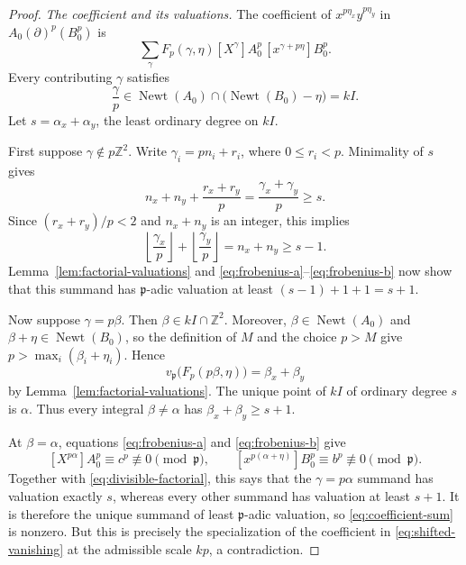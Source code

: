 \documentclass[11pt]{article}
\newcommand{\Z}{\mathbb Z}
\newcommand{\Newt}{\operatorname{Newt}}
\begin{document}
\begin{proof}
\emph{The coefficient and its valuations.}
The coefficient of $x^{p\eta_x}y^{p\eta_y}$ in
$A_0(\partial)^p(B_0^p)$ is
\begin{equation}\label{eq:coefficient-sum}
 \sum_\gamma
 F_p(\gamma,\eta)
 [X^\gamma]A_0^p\,
 [x^{\gamma+p\eta}]B_0^p.
\end{equation}
Every contributing $\gamma$ satisfies
\[
 \frac{\gamma}{p}\in
 \Newt(A_0)\cap\bigl(\Newt(B_0)-\eta\bigr)=kI.
\]
Let $s=\alpha_x+\alpha_y$, the least ordinary degree on $kI$.

First suppose $\gamma\notin p\Z^2$.  Write
$\gamma_i=pn_i+r_i$, where $0\leq r_i<p$.  Minimality of $s$ gives
\[
 n_x+n_y+\frac{r_x+r_y}{p}
 =\frac{\gamma_x+\gamma_y}{p}\geq s.
\]
Since $(r_x+r_y)/p<2$ and $n_x+n_y$ is an integer, this implies
\begin{equation}\label{eq:floor-bound}
 \left\lfloor\frac{\gamma_x}{p}\right\rfloor+
 \left\lfloor\frac{\gamma_y}{p}\right\rfloor
 =n_x+n_y\geq s-1.
\end{equation}
Lemma~\ref{lem:factorial-valuations} and
\eqref{eq:frobenius-a}--\eqref{eq:frobenius-b} now show that this summand
has $\mathfrak p$-adic valuation at least $(s-1)+1+1=s+1$.

Now suppose $\gamma=p\beta$.  Then $\beta\in kI\cap\Z^2$.  Moreover,
$\beta\in\Newt(A_0)$ and $\beta+\eta\in\Newt(B_0)$, so the definition of
$M$ and the choice $p>M$ give
$p>\max_i(\beta_i+\eta_i)$.  Hence
\begin{equation}\label{eq:divisible-factorial}
 v_{\mathfrak p}\bigl(F_p(p\beta,\eta)\bigr)
 =\beta_x+\beta_y
\end{equation}
by Lemma~\ref{lem:factorial-valuations}.  The unique point of $kI$ of
ordinary degree $s$ is $\alpha$.  Thus every integral
$\beta\ne\alpha$ has $\beta_x+\beta_y\geq s+1$.

At $\beta=\alpha$, equations \eqref{eq:frobenius-a} and
\eqref{eq:frobenius-b} give
\[
 [X^{p\alpha}]A_0^p\equiv c^p\not\equiv0\pmod{\mathfrak p},
 \qquad
 [x^{p(\alpha+\eta)}]B_0^p\equiv b^p\not\equiv0
 \pmod{\mathfrak p}.
\]
Together with \eqref{eq:divisible-factorial}, this says that the
$\gamma=p\alpha$ summand has valuation exactly $s$, whereas every other
summand has valuation at least $s+1$.  It is therefore the unique summand
of least $\mathfrak p$-adic valuation, so \eqref{eq:coefficient-sum} is
nonzero.  But this is precisely the specialization of the coefficient in
\eqref{eq:shifted-vanishing} at the admissible scale $kp$, a contradiction.
\end{proof}
\end{document}

